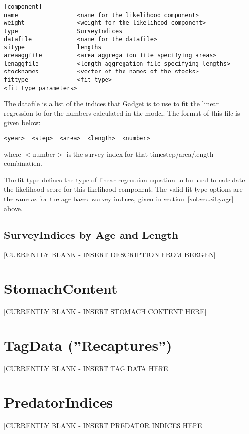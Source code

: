 \documentclass [a4paper, 10pt]{book}
\begin{document}
\begin{verbatim}
[component]
name                 <name for the likelihood component>
weight               <weight for the likelihood component>
type                 SurveyIndices
datafile             <name for the datafile>
sitype               lengths
areaaggfile          <area aggregation file specifying areas>
lenaggfile           <length aggregation file specifying lengths>
stocknames           <vector of the names of the stocks>
fittype              <fit type>
<fit type parameters>
\end{verbatim}

The datafile is a list of the indices that Gadget is to use to fit the linear regression to for the numbers calculated in the model.  The format of this file is given below:

\begin{verbatim}
<year>  <step>  <area>  <length>  <number>
\end{verbatim}

where $<$number$>$ is the survey index for that timestep/area/length combination.

\bigskip
The fit type defines the type of linear regression equation to be used to calculate the likelihood score for this likelihood component.  The valid fit type options are the sane as for the age based survey indices, given in section~\ref{subsec:sibyage} above.

\subsection{SurveyIndices by Age and Length}\label{subsec:sibyageandlength}
[CURRENTLY BLANK - INSERT DESCRIPTION FROM BERGEN]

\section{StomachContent}\label{sec:stomach}
[CURRENTLY BLANK - INSERT STOMACH CONTENT HERE]

\section{TagData (''Recaptures'')}\label{sec:tagdata}
[CURRENTLY BLANK - INSERT TAG DATA HERE]

\section{PredatorIndices}\label{sec:predatorindex}
[CURRENTLY BLANK - INSERT PREDATOR INDICES HERE]
\end{document}
